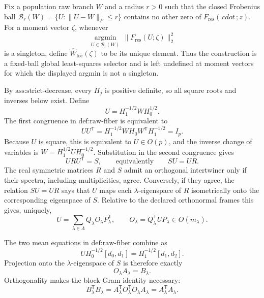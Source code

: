 Fix a population raw branch \(W\) and a radius \(r>0\) such that the closed Frobenius ball \(\mathcal B_r(W)=\{U:\lVert U-W\rVert_F\leq r\}\) contains no other zero of \(F_{\mathrm{res}}(\,cdot\,;z)\).  For a moment vector \(\zeta\), whenever
\[
 \underset{U\in\mathcal B_r(W)}{\operatorname{argmin}}\,
 \lVert F_{\mathrm{res}}(U;\zeta)\rVert_2^2
\]
is a singleton, define \(\widehat W_{\mathrm{loc}}(\zeta)\) to be its unique element.  Thus the construction is a fixed-ball global least-squares selector and is left undefined at moment vectors for which the displayed argmin is not a singleton.

By \(\text{ass:strict-decrease}\), every \(H_j\) is positive definite, so all square roots and inverses below exist.  Define
\[
 U=H_1^{-1/2}WH_0^{1/2}.
\]
The first congruence in \(\text{def:raw-fiber}\) is equivalent to
\[
 UU^{\mathsf T}=H_1^{-1/2}WH_0W^{\mathsf T}H_1^{-1/2}=I_p.
\]
Because \(U\) is square, this is equivalent to \(U\in O(p)\), and the inverse change of variables is \(W=H_1^{1/2}UH_0^{-1/2}\).  Substitution in the second congruence gives
\[
 URU^{\mathsf T}=S,
 \qquad\text{equivalently}\qquad SU=UR.
\]
The real symmetric matrices \(R\) and \(S\) admit an orthogonal intertwiner only if their spectra, including multiplicities, agree.  Conversely, if they agree, the relation \(SU=UR\) says that \(U\) maps each \(\lambda\)-eigenspace of \(R\) isometrically onto the corresponding eigenspace of \(S\).  Relative to the declared orthonormal frames this gives, uniquely,
\[
 U=\sum_{\lambda\in\Lambda}Q_\lambda O_\lambda P_\lambda^{\mathsf T},
 \qquad O_\lambda=Q_\lambda^{\mathsf T}UP_\lambda\in O(m_\lambda).
\]

The two mean equations in \(\text{def:raw-fiber}\) combine as
\[
 U H_0^{-1/2}[d_0,d_1]=H_1^{-1/2}[d_1,d_2].
\]
Projection onto the \(\lambda\)-eigenspace of \(S\) is therefore exactly
\[
 O_\lambda A_\lambda=B_\lambda.
\]
Orthogonality makes the block Gram identity necessary:
\[
 B_\lambda^{\mathsf T}B_\lambda
 =A_\lambda^{\mathsf T}O_\lambda^{\mathsf T}O_\lambda A_\lambda
 =A_\lambda^{\mathsf T}A_\lambda.
\]

